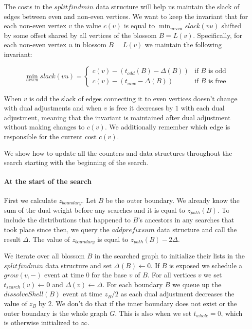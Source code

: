The costs in the $splitfindmin$ data structure will help us maintain the slack of edges between even and non-even vertices. We want to keep the invariant that for each non-even vertex $v$ the value $c(v)$ is equal to $\min_{u \text{even}} slack(vu)$ shifted by some offset shared by all vertices of the blossom $B = L(v)$. Specifically, for each non-even vertex $u$ in blossom $B = L(v)$ we maintain the following invariant:

\[ 
\min_{u \text{even}} slack(vu) = \begin{cases}
    c(v) - (t_{odd}(B) - \Delta(B)) & \text{if $B$ is odd} \\
    c(v) - (t_{now} - \Delta(B)) & \text{if $B$ is free}
\end{cases}
\]

When $v$ is odd the slack of edges connecting it to even vertices doesn't change with dual adjustments and when $v$ is free it decreases by $1$ with each dual adjustment, meaning that the invariant is maintained after dual adjustment without making changes to $c(v)$. We additionally remember which edge is responsible for the current cost $c(v)$.

We show how to update all the counters and data structures throughout the search starting with the beginning of the search. 

\paragraph*{At the start of the search} First we calculate $z_{boundary}$. Let $B$ be the outer boundary. We already know the sum of the dual weight before any searches and it is equal to $z_{path}(B)$. To include the distributions that happened to $B$'s ancestors in any searches that took place since then, we query the $addprefixsum$ data structure and call the result $\Delta$. The value of $z_{boundary}$ is equal to $z_{path}(B) - 2\Delta$. 

We iterate over all blossom $B$ in the searched graph to initialize their lists in the $splitfindmin$ data structure and set $\Delta(B) \gets 0$. If $B$ is exposed we schedule a $grow(v, -)$ event at time $0$ for the base $v$ of $B$. For all vertices $v$ we set $t_{search}(v) \gets 0$ and $\Delta(v) \gets \Delta$. For each boundary $B$ we queue up the $dissolveShell(B)$ event at time $z_B / 2$ as each dual adjustment decreases the value of $z_B$ by $2$. We don't do that if the inner boundary does not exist or the outer boundary is the whole graph $G$. This is also when we set $t_{whole} = 0$, which is otherwise initialized to $\infty$.

